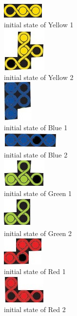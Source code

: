 \begin{center}
\includegraphics{yellow1.jpg} 
\\initial state of Yellow 1
\\\includegraphics{yellow2.jpg}
\\initial state of Yellow 2
\\\includegraphics{blue1.jpg}
\\initial state of Blue 1
\\\includegraphics{blue2.jpg}
\\initial state of Blue 2
\\\includegraphics{green1.jpg}
\\initial state of Green 1 
\\\includegraphics{green2.jpg}
\\initial state of Green 2
\\\includegraphics{red1.jpg}
\\initial state of Red 1 
\\\includegraphics{red2.jpg}
\\initial state of Red 2 
\end{center}
